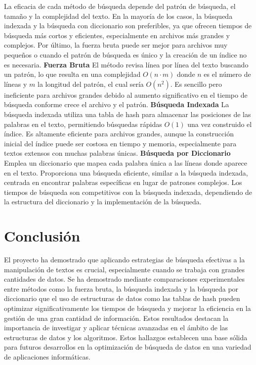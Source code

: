 \documentclass[12pt, twoside]{article}
\begin{document}
La eficacia de cada método de búsqueda depende del patrón de búsqueda, el tamaño y la complejidad del texto. En la mayoría de los casos, la búsqueda indexada y la búsqueda con diccionario son preferibles, ya que ofrecen tiempos de búsqueda más cortos y eficientes, especialmente en archivos más grandes y complejos. Por último, la fuerza bruta puede ser mejor para archivos muy pequeños o cuando el patrón de búsqueda es único y la creación de un índice no es necesaria.
\newpage
\textbf{Fuerza Bruta}
El método revisa línea por línea del texto buscando un patrón, lo que resulta en una complejidad $O(n \cdot m)$ donde $n$ es el número de líneas y $m$ la longitud del patrón, el cual sería $O(n^{2})$. Es sencillo pero ineficiente para archivos grandes debido al aumento significativo en el tiempo de búsqueda conforme crece el archivo y el patrón.
\newline
\newline
\textbf{Búsqueda Indexada}
La búsqueda indexada utiliza una tabla de hash para almacenar las posiciones de las palabras en el texto, permitiendo búsquedas rápidas $O(1)$ una vez construido el índice. Es altamente eficiente para archivos grandes, aunque la construcción inicial del índice puede ser costosa en tiempo y memoria, especialmente para textos extensos con muchas palabras únicas.
\newline
\newline
\textbf{Búsqueda por Diccionario}
Emplea un diccionario que mapea cada palabra única a las líneas donde aparece en el texto. Proporciona una búsqueda eficiente, similar a la búsqueda indexada, centrada en encontrar palabras específicas en lugar de patrones complejos. Los tiempos de búsqueda son competitivos con la búsqueda indexada, dependiendo de la estructura del diccionario y la implementación de la búsqueda.



\newpage



\section{Conclusión}
El proyecto ha demostrado que aplicando estrategias de búsqueda efectivas a la manipulación de textos es crucial, especialmente cuando se trabaja con grandes cantidades de datos. Se ha demostrado mediante comparaciones experimentales entre métodos como la fuerza bruta, la búsqueda indexada y la búsqueda por diccionario que el uso de estructuras de datos como las tablas de hash pueden optimizar significativamente los tiempos de búsqueda y mejorar la eficiencia en la gestión de una gran cantidad de información. Estos resultados destacan la importancia de investigar y aplicar técnicas avanzadas en el ámbito de las estructuras de datos y los algoritmos. Estos hallazgos establecen una base sólida para futuros desarrollos en la optimización de búsqueda de datos en una variedad de aplicaciones informáticas.
\end{document}
